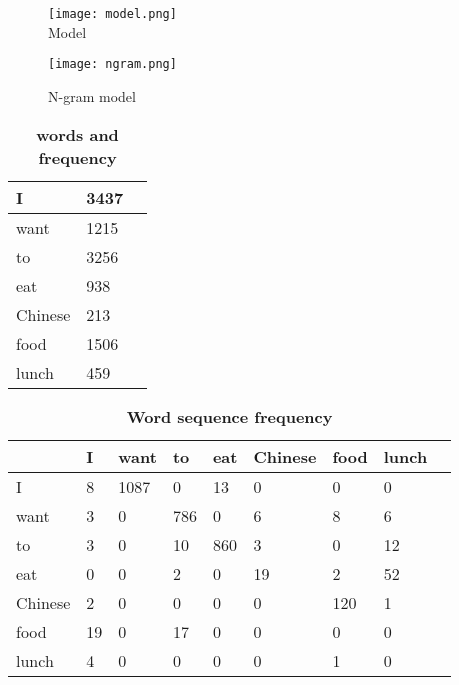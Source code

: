\documentclass[35pt]{article}
\begin{document}
 \begin{figure}[ht]
 \centering
 \texttt{[image: model.png]}\\
 \caption{Model}\label{Figure1}
  \centering
 \texttt{[image: ngram.png]}\\
 \caption{N-gram model}\label{Figure2}
\end{figure}
\onecolumn
 \begin{table}[!htbp]
  \centering
 \begin{tabular}{|p{2cm}|p{2cm}|p{2cm}}
   \hline
     I & 3437\\
  \hline
     want & 1215\\
   \hline
      to & 3256 \\
   \hline
     eat & 938\\
  \hline
     Chinese & 213\\
   \hline
   food & 1506\\
   \hline
   lunch & 459\\
   \hline
  \end{tabular}
  \caption{\textbf{words and frequency}} \label{Table1}
  \end{table}
\begin{table}[!htbp]
  \centering
 \begin{tabular}{|p{1cm}|p{1cm}|p{1cm}|p{1cm}|p{1cm}|p{1cm}|p{1cm}|p{1cm}|p{1cm}}
    \hline
        & I & want & to & eat & Chinese & food & lunch \\
   \hline
      I & 8 & 1087 & 0 & 13 & 0 & 0 & 0\\
  \hline
     want & 3 & 0 & 786 & 0 & 6 & 8 & 6\\
   \hline
    to & 3 & 0 & 10 & 860 & 3 & 0 & 12\\
   \hline
     eat & 0 & 0 & 2 & 0 & 19 & 2 & 52\\
    \hline
     Chinese & 2 & 0 & 0 & 0 & 0 & 120 & 1\\
    \hline
     food  & 19 & 0 & 17 & 0 & 0 & 0 & 0\\
   \hline
     lunch & 4 & 0 & 0 & 0 & 0 & 1 & 0 \\
   \hline
  \end{tabular}
  \caption{\textbf{Word sequence frequency}} \label{Table2}
  \end{table}
  

\end{document}
